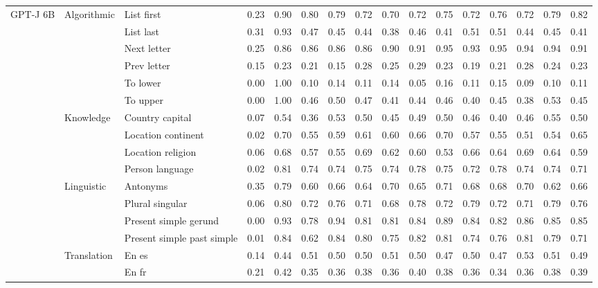 \begin{center}
\begin{longtable}{lllrrrrrrrrrrrrr}
\multirow[t]{18}{*}{GPT-J 6B} & \multirow[t]{6}{*}{Algorithmic} & List first & 0.23 & 0.90 & 0.80 & 0.79 & 0.72 & 0.70 & 0.72 & 0.75 & 0.72 & 0.76 & 0.72 & 0.79 & 0.82 \\
 &  & List last & 0.31 & 0.93 & 0.47 & 0.45 & 0.44 & 0.38 & 0.46 & 0.41 & 0.51 & 0.51 & 0.44 & 0.45 & 0.41 \\
 &  & Next letter & 0.25 & 0.86 & 0.86 & 0.86 & 0.86 & 0.90 & 0.91 & 0.95 & 0.93 & 0.95 & 0.94 & 0.94 & 0.91 \\
 &  & Prev letter & 0.15 & 0.23 & 0.21 & 0.15 & 0.28 & 0.25 & 0.29 & 0.23 & 0.19 & 0.21 & 0.28 & 0.24 & 0.23 \\
 &  & To lower & 0.00 & 1.00 & 0.10 & 0.14 & 0.11 & 0.14 & 0.05 & 0.16 & 0.11 & 0.15 & 0.09 & 0.10 & 0.11 \\
 &  & To upper & 0.00 & 1.00 & 0.46 & 0.50 & 0.47 & 0.41 & 0.44 & 0.46 & 0.40 & 0.45 & 0.38 & 0.53 & 0.45 \\
\cline{2-16}
 & \multirow[t]{4}{*}{Knowledge} & Country capital & 0.07 & 0.54 & 0.36 & 0.53 & 0.50 & 0.45 & 0.49 & 0.50 & 0.46 & 0.40 & 0.46 & 0.55 & 0.50 \\
 &  & Location continent & 0.02 & 0.70 & 0.55 & 0.59 & 0.61 & 0.60 & 0.66 & 0.70 & 0.57 & 0.55 & 0.51 & 0.54 & 0.65 \\
 &  & Location religion & 0.06 & 0.68 & 0.57 & 0.55 & 0.69 & 0.62 & 0.60 & 0.53 & 0.66 & 0.64 & 0.69 & 0.64 & 0.59 \\
 &  & Person language & 0.02 & 0.81 & 0.74 & 0.74 & 0.75 & 0.74 & 0.78 & 0.75 & 0.72 & 0.78 & 0.74 & 0.74 & 0.71 \\
\cline{2-16}
 & \multirow[t]{4}{*}{Linguistic} & Antonyms & 0.35 & 0.79 & 0.60 & 0.66 & 0.64 & 0.70 & 0.65 & 0.71 & 0.68 & 0.68 & 0.70 & 0.62 & 0.66 \\
 &  & Plural singular & 0.06 & 0.80 & 0.72 & 0.76 & 0.71 & 0.68 & 0.78 & 0.72 & 0.79 & 0.72 & 0.71 & 0.79 & 0.76 \\
 &  & Present simple gerund & 0.00 & 0.93 & 0.78 & 0.94 & 0.81 & 0.81 & 0.84 & 0.89 & 0.84 & 0.82 & 0.86 & 0.85 & 0.85 \\
 &  & Present simple past simple & 0.01 & 0.84 & 0.62 & 0.84 & 0.80 & 0.75 & 0.82 & 0.81 & 0.74 & 0.76 & 0.81 & 0.79 & 0.71 \\
\cline{2-16}
 & \multirow[t]{4}{*}{Translation} & En es & 0.14 & 0.44 & 0.51 & 0.50 & 0.50 & 0.51 & 0.50 & 0.47 & 0.50 & 0.47 & 0.53 & 0.51 & 0.49 \\
 &  & En fr & 0.21 & 0.42 & 0.35 & 0.36 & 0.38 & 0.36 & 0.40 & 0.38 & 0.36 & 0.34 & 0.36 & 0.38 & 0.39 \\

\end{longtable}
\end{center}
